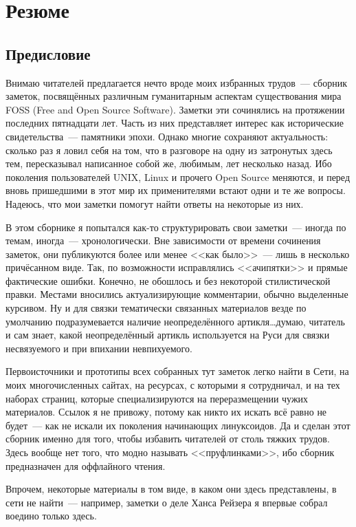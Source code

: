 \chapter{Резюме}

\section{Предисловие} 

Внимаю читателей предлагается нечто вроде моих избранных трудов~--- сборник заметок, посвящённых различным гуманитарным аспектам существования мира FOSS (Free and Open Source Software). Заметки эти сочинялись на протяжении последних пятнадцати лет. Часть из них представляет интерес как исторические свидетельства~--- памятники эпохи. Однако многие сохраняют актуальность: сколько раз я ловил себя на том, что в разговоре на одну из затронутых здесь тем, пересказывал написанное собой же, любимым, лет несколько назад. Ибо поколения пользователей UNIX, Linux и прочего Open Source меняются, и перед вновь пришедшими в этот мир их применителями встают одни и те же вопросы. Надеюсь, что мои заметки помогут найти ответы на некоторые из них.

В этом сборнике я попытался как-то структурировать свои заметки~--- иногда по темам, иногда~--- хронологически. Вне зависимости от времени сочинения заметок, они публикуются более или менее <<как было>>~--- лишь в несколько причёсанном виде. Так, по возможности исправлялись <<ачипятки>> и прямые фактические ошибки. Конечно, не обошлось и без некоторой стилистической правки. Местами вносились актуализирующие комментарии, обычно выделенные курсивом. Ну и для связки тематически связанных материалов везде по умолчанию подразумевается наличие неопределённого артикля\dots думаю, читатель и сам знает, какой неопределённый артикль используется на Руси для связки несвязуемого и при  впихании невпихуемого.

Первоисточники и прототипы всех собранных тут заметок легко найти в Сети, на моих многочисленных сайтах, на ресурсах, с которыми я сотрудничал, и на тех наборах страниц, которые специализируются на переразмещении чужих материалов. Ссылок я не привожу, потому как никто их искать всё равно не будет~--- как не искали их поколения начинающих линуксоидов. Да и сделан этот сборник именно для того, чтобы избавить читателей от столь тяжких трудов. Здесь вообще нет того, что модно называть <<пруфлинками>>, ибо сборник предназначен для оффлайного чтения.

Впрочем, некоторые материалы в том виде, в каком они здесь представлены, в сети не найти~--- например, заметки о деле Ханса Рейзера я впервые собрал воедино только здесь.

